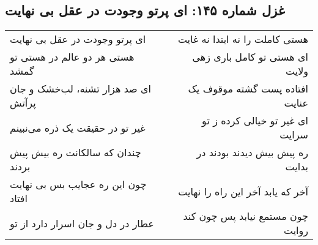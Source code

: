 \begin{center}
\section*{غزل شماره ۱۴۵: ای پرتو وجودت در عقل بی نهایت}
\label{sec:145}
\begin{longtable}{l p{0.5cm} r}
ای پرتو وجودت در عقل بی نهایت
&&
هستی کاملت را نه ابتدا نه غایت
\\
هستی هر دو عالم در هستی تو گمشد
&&
ای هستی تو کامل باری زهی ولایت
\\
ای صد هزار تشنه، لب‌خشک و جان پرآتش
&&
افتاده پست گشته موقوف یک عنایت
\\
غیر تو در حقیقت یک ذره می‌نبینم
&&
ای غیر تو خیالی کرده ز تو سرایت
\\
چندان که سالکانت ره بیش پیش بردند
&&
ره پیش بیش دیدند بودند در بدایت
\\
چون این ره عجایب بس بی نهایت افتاد
&&
آخر که یابد آخر این راه را نهایت
\\
عطار در دل و جان اسرار دارد از تو
&&
چون مستمع نیابد پس چون کند روایت
\\
\end{longtable}
\end{center}
